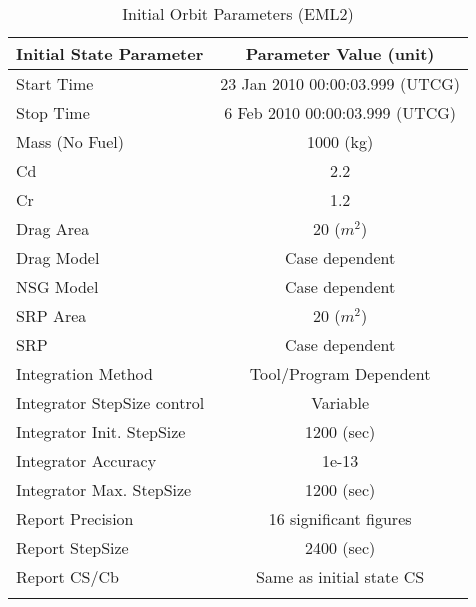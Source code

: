 \begin{table}[htbp!]
\centering \caption{Initial Orbit Parameters (EML2)}
      \begin{tabular}{lc}
      \hline\hline
            Initial State Parameter & Parameter Value (unit)\\
            \hline
            Start Time & 23 Jan 2010 00:00:03.999 (UTCG)\\
            Stop Time & 6 Feb 2010 00:00:03.999 (UTCG)\\
            
            Mass (No Fuel) & 1000 (kg)\\
            Cd & 2.2\\
            Cr & 1.2\\
            Drag Area & 20 ($m^2$)\\
            Drag Model & Case dependent\\
            NSG Model & Case dependent\\
            SRP Area & 20 ($m^2$)\\
            SRP & Case dependent\\
            Integration Method & Tool/Program Dependent\\
            Integrator StepSize control & Variable\\
            Integrator Init. StepSize & 1200 (sec)\\
            Integrator Accuracy & 1e-13\\
            Integrator Max. StepSize & 1200 (sec)\\
            Report Precision & 16 significant figures\\
            Report StepSize & 2400 (sec)\\
            Report CS/Cb & Same as initial state CS\\
      \hline\hline
      \label{Table: InitStateEML2}
\end{tabular}
\end{table}

